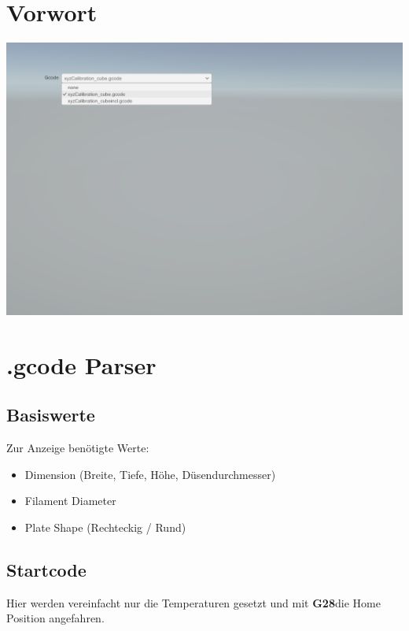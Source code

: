 \section{Vorwort}

\includegraphics[width=\paperwidth-3cm]{./pictures/dropdown.png}


\section{.gcode Parser}

\subsection{Basiswerte}


Zur Anzeige benötigte Werte:
\begin{itemize}
  \item Dimension (Breite, Tiefe, Höhe, Düsendurchmesser)
  \item Filament Diameter
  \item Plate Shape (Rechteckig / Rund)
\end{itemize}

\subsection{Startcode}

Hier werden vereinfacht nur die Temperaturen gesetzt und mit \textbf{G28}die Home Position angefahren.


